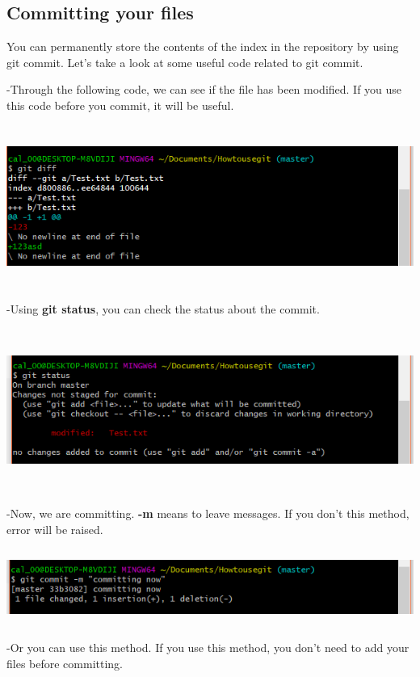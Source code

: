 \documentclass[11pt]{article}
\begin{document}
	\pagebreak	
	\subsection{Committing your files}
	You can permanently store the contents of the index in the repository by using git commit. Let's take a look at some useful code related to git commit.

	-Through the following code, we can see if the file has been modified. If you use this code before you commit, it will be useful.

	\includegraphics[height=5.3cm, width=14cm]{gitdiff.PNG}
	
	-Using \textbf{git status}, you can check the status about the commit.

	\includegraphics[height=5.3cm, width=14cm]{gitstatus.PNG}

	-Now, we are committing. \textbf{-m} means to leave messages. If you don't this method, error will be raised.

	\includegraphics[height=2.5cm, width=14cm]{gitcommit.PNG}

	-Or you can use this method. If you use this method, you don't need to add your files before committing.
\end{document}
